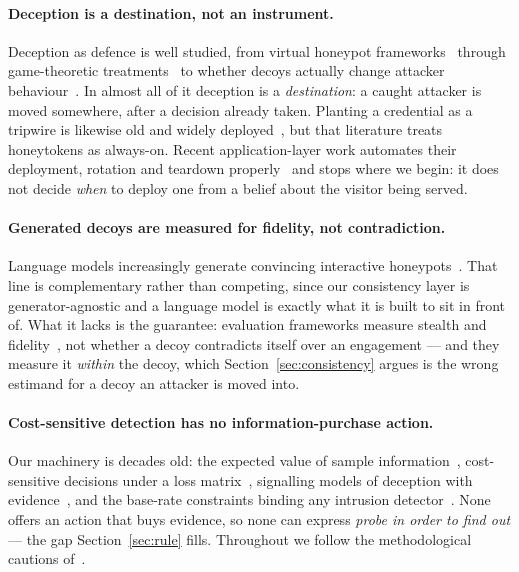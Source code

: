 \documentclass[runningheads]{llncs}
\begin{document}
\paragraph{Deception is a destination, not an instrument.}
Deception as defence is well studied, from virtual honeypot
frameworks~\cite{provos2004honeyd} through game-theoretic
treatments~\cite{pawlick2019taxonomy} to whether decoys actually change attacker
behaviour~\cite{fergusonwalter2021examining}. In almost all of it deception is a
\emph{destination}: a caught attacker is moved somewhere, after a decision already
taken. Planting a credential as a tripwire is likewise old and widely
deployed~\cite{yuill2004honeyfiles,juels2013honeywords}, but that literature treats
honeytokens as always-on. Recent application-layer work automates their deployment,
rotation and teardown properly~\cite{kahlhofer2024applayer,kahlhofer2025koney} and
stops where we begin: it does not decide \emph{when} to deploy one from a belief
about the visitor being served.

\paragraph{Generated decoys are measured for fidelity, not contradiction.}
Language models increasingly generate convincing interactive
honeypots~\cite{sladic2024shellm,bridges2025sok}. That line is complementary rather
than competing, since our consistency layer is generator-agnostic and a language
model is exactly what it is built to sit in front of. What it lacks is the
guarantee: evaluation frameworks measure stealth and
fidelity~\cite{vero2026honeyval}, not whether a decoy contradicts itself over an
engagement --- and they measure it \emph{within} the decoy, which
Section~\ref{sec:consistency} argues is the wrong estimand for a decoy an attacker
is moved into.

\paragraph{Cost-sensitive detection has no information-purchase action.}
Our machinery is decades old: the expected value of sample
information~\cite{howard1966information}, cost-sensitive decisions under a loss
matrix~\cite{elkan2001foundations}, signalling models of deception with
evidence~\cite{pawlick2019leaky}, and the base-rate constraints binding any
intrusion detector~\cite{axelsson2000baserate}. None offers an action that buys
evidence, so none can express \emph{probe in order to find out} --- the gap
Section~\ref{sec:rule} fills. Throughout we follow the methodological cautions
of~\cite{sommer2010outside,arp2022dos}.
\end{document}
